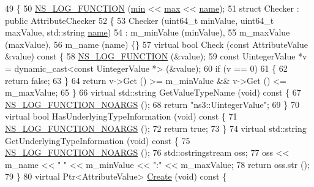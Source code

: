 \begin{DoxyCode}
49 \{
50   \hyperlink{log-macros-disabled_8h_a90b90d5bad1f39cb1b64923ea94c0761}{NS\_LOG\_FUNCTION} (\hyperlink{80211b_8c_ac6afabdc09a49a433ee19d8a9486056d}{min} << \hyperlink{80211b_8c_affe776513b24d84b39af8ab0930fef7f}{max} << \hyperlink{generate__test__data__lte__spectrum__model_8m_ab74e6bf80237ddc4109968cedc58c151}{name});
51   \textcolor{keyword}{struct }Checker : \textcolor{keyword}{public} AttributeChecker
52   \{
53     Checker (uint64\_t minValue, uint64\_t maxValue, std::string \hyperlink{generate__test__data__lte__spectrum__model_8m_ab74e6bf80237ddc4109968cedc58c151}{name})
54       : m\_minValue (minValue),
55         m\_maxValue (maxValue),
56         m\_name (name) \{\}
57     \textcolor{keyword}{virtual} \textcolor{keywordtype}{bool} Check (\textcolor{keyword}{const} AttributeValue &value)\textcolor{keyword}{ const }\{
58       \hyperlink{log-macros-disabled_8h_a90b90d5bad1f39cb1b64923ea94c0761}{NS\_LOG\_FUNCTION} (&value);
59       \textcolor{keyword}{const} UintegerValue *v = \textcolor{keyword}{dynamic\_cast<}\textcolor{keyword}{const }UintegerValue *\textcolor{keyword}{>} (&value);
60       \textcolor{keywordflow}{if} (v == 0)
61         \{
62           \textcolor{keywordflow}{return} \textcolor{keyword}{false};
63         \}
64       \textcolor{keywordflow}{return} v->Get () >= m\_minValue && v->Get () <= m\_maxValue;
65     \}
66     \textcolor{keyword}{virtual} std::string GetValueTypeName (\textcolor{keywordtype}{void})\textcolor{keyword}{ const }\{
67       \hyperlink{log-macros-disabled_8h_a8f7e4afc291c9d29a65c18ac1f79197b}{NS\_LOG\_FUNCTION\_NOARGS} ();
68       \textcolor{keywordflow}{return} \textcolor{stringliteral}{"ns3::UintegerValue"};
69     \}
70     \textcolor{keyword}{virtual} \textcolor{keywordtype}{bool} HasUnderlyingTypeInformation (\textcolor{keywordtype}{void})\textcolor{keyword}{ const }\{
71       \hyperlink{log-macros-disabled_8h_a8f7e4afc291c9d29a65c18ac1f79197b}{NS\_LOG\_FUNCTION\_NOARGS} ();
72       \textcolor{keywordflow}{return} \textcolor{keyword}{true};
73     \}
74     \textcolor{keyword}{virtual} std::string GetUnderlyingTypeInformation (\textcolor{keywordtype}{void})\textcolor{keyword}{ const }\{
75       \hyperlink{log-macros-disabled_8h_a8f7e4afc291c9d29a65c18ac1f79197b}{NS\_LOG\_FUNCTION\_NOARGS} ();
76       std::ostringstream oss;
77       oss << m\_name << \textcolor{stringliteral}{" "} << m\_minValue << \textcolor{stringliteral}{":"} << m\_maxValue;
78       \textcolor{keywordflow}{return} oss.str ();
79     \}
80     \textcolor{keyword}{virtual} Ptr<AttributeValue> \hyperlink{group__ptr_ga0406dd2d929ceac05ce39d4579fa3e4b}{Create} (\textcolor{keywordtype}{void})\textcolor{keyword}{ const }\{

\end{DoxyCode}
